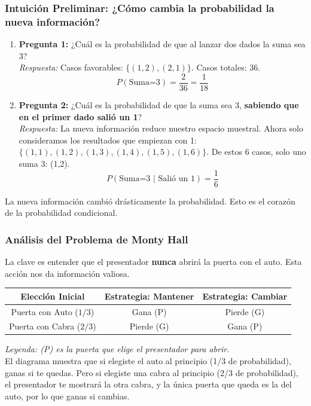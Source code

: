 \documentclass[12pt, letterpaper]{article}
\begin{document}
\subsubsection{Intuición Preliminar: ¿Cómo cambia la probabilidad la nueva información?}
\begin{enumerate}
	\item \textbf{Pregunta 1:} ¿Cuál es la probabilidad de que al lanzar dos dados la suma sea 3? \\
	      \textit{Respuesta:} Casos favorables: $\{(1,2), (2,1)\}$. Casos totales: 36.
	      \[ P(\text{Suma=3}) = \frac{2}{36} = \frac{1}{18} \]
	\item \textbf{Pregunta 2:} ¿Cuál es la probabilidad de que la suma sea 3, \textbf{sabiendo que en el primer dado salió un 1}? \\
	      \textit{Respuesta:} La nueva información reduce nuestro espacio muestral. Ahora solo consideramos los resultados que empiezan con 1: $\{(1,1), (1,2), (1,3), (1,4), (1,5), (1,6)\}$. De estos 6 casos, solo uno suma 3: (1,2).
	      \[ P(\text{Suma=3 | Salió un 1}) = \frac{1}{6} \]
\end{enumerate}
La nueva información cambió drásticamente la probabilidad. Esto es el corazón de la probabilidad condicional.

\subsubsection{Análisis del Problema de Monty Hall}
La clave es entender que el presentador \textbf{nunca} abrirá la puerta con el auto. Esta acción nos da información valiosa.
\begin{center}
	\begin{tabular}{|c|c|c|}
		\hline
		\textbf{Elección Inicial} & \textbf{Estrategia: Mantener} & \textbf{Estrategia: Cambiar} \\ \hline
		Puerta con Auto ($1/3$)   & Gana (P)                      & Pierde (G)                   \\ \hline
		Puerta con Cabra ($2/3$)  & Pierde (G)                    & Gana (P)                     \\
		\hline
	\end{tabular}
\end{center}
\textit{Leyenda: (P) es la puerta que elige el presentador para abrir.} \\
El diagrama muestra que si elegiste el auto al principio (1/3 de probabilidad), ganas si te quedas. Pero si elegiste una cabra al principio (2/3 de probabilidad), el presentador te mostrará la otra cabra, y la única puerta que queda es la del auto, por lo que ganas si cambias.
\end{document}
